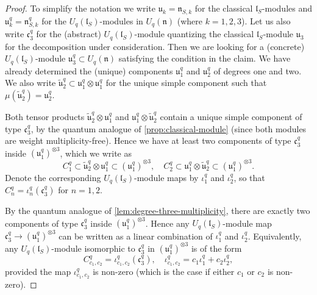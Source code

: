 \documentclass[a4paper, 12pt, reqno, english]{amsart}
\numberwithin{equation}{section}
\numberwithin{figure}{section}
\theoremstyle{plain}
\theoremstyle{plain}
\theoremstyle{plain}
\theoremstyle{plain}
\theoremstyle{plain}
\theoremstyle{definition}
\theoremstyle{definition}
\theoremstyle{definition}
\theoremstyle{remark}
\theoremstyle{definition}
\theoremstyle{definition}
\newcommand{\Uqn}{U_q(\mathfrak{n})}
\newcommand{\UqlS}{U_q(\mathfrak{l}_S)}
\newcommand{\liec}{\mathfrak{c}}
\newcommand{\liel}{\mathfrak{l}}
\newcommand{\lien}{\mathfrak{n}}
\newcommand{\lieu}{\mathfrak{u}}
\newcommand{\qnil}{\lien^q}
\begin{document}
\begin{proof}
To simplify the notation we write $\lieu_k = \lien_{S, k}$ for the classical $\liel_S$-modules and $\lieu^q_k = \qnil_{S, k}$ for the $\UqlS$-modules in $\Uqn$ (where $k = 1, 2, 3$).
Let us also write $\liec^q_3$ for the (abstract) $\UqlS$-module quantizing the classical $\liel_S$-module $\lieu_3$ for the decomposition under consideration.
Then we are looking for a (concrete) $\UqlS$-module $\lieu^q_3 \subset \Uqn$ satisfying the condition in the claim.
We have already determined the (unique) components $\lieu^q_1$ and $\lieu^q_2$ of degrees one and two.
We also write $\tilde{\lieu}^q_2 \subset \lieu^q_1 \otimes \lieu^q_1$ for the unique simple component such that $\mu(\tilde{\lieu}^q_2) = \lieu^q_2$.

Both tensor products $\tilde{\lieu}^q_2 \otimes \lieu^q_1$ and $\lieu^q_1 \otimes \tilde{\lieu}^q_2$ contain a unique simple component of type $\liec^q_3$, by the quantum analogue of \cref{prop:classical-module} (since both modules are weight multiplicity-free).
Hence we have at least two components of type $\liec^q_3$ inside $(\lieu^q_1)^{\otimes 3}$, which we write as
\[
C^q_1 \subset \tilde{\lieu}^q_2 \otimes \lieu^q_1 \subset (\lieu^q_1)^{\otimes 3}, \quad
C^q_2 \subset \lieu^q_1 \otimes \tilde{\lieu}^q_2 \subset (\lieu^q_1)^{\otimes 3}.
\]
Denote the corresponding $\UqlS$-module maps by $\iota^q_1$ and $\iota^q_2$, so that $C^q_n = \iota^q_n(\liec^q_3)$ for $n = 1, 2$.

By the quantum analogue of \cref{lem:degree-three-multiplicity}, there are exactly two components of type $\liec^q_3$ inside $(\lieu^q_1)^{\otimes 3}$.
Hence any $\UqlS$-module map $\liec^q_3 \to (\lieu^q_1)^{\otimes 3}$ can be written as a linear combination of $\iota^q_1$ and $\iota^q_2$. Equivalently, any $\UqlS$-module isomorphic to $\liec^q_3$ in $(\lieu^q_1)^{\otimes 3}$ is of the form
\[
C^q_{c_1, c_2} = \iota^q_{c_1, c_2} (\liec^q_3), \quad
\iota^q_{c_1, c_2} = c_1 \iota^q_1 + c_2 \iota^q_2,
\]
provided the map $\iota^q_{c_1, c_2}$ is non-zero (which is the case if either $c_1$ or $c_2$ is non-zero).


\end{proof}
\end{document}
